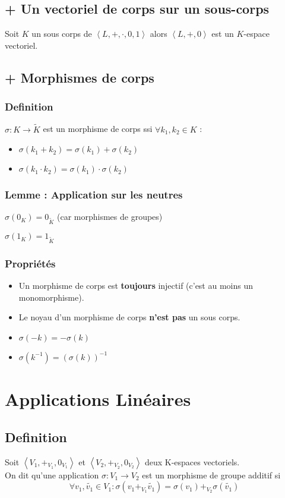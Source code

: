\documentclass[a4paper,10pt]{article}
\newcommand{\ap}{ \rightarrow} %
\newcommand{\mt}[1]{\widetilde{ #1 }} %
\newcommand{\grp}[1]{\left\langle #1 \right\rangle} %
\begin{document}
  \subsection{+ Un vectoriel de corps sur un sous-corps}
   Soit $K$ un sous corps de $\grp{L, + , \cdot, 0, 1}$ alors $\grp{L, +, 0}$ est un $K$-espace vectoriel.

  \subsection{+ Morphismes de corps}
   \subsubsection{Definition}
   $\sigma : K \ap \mt{K}$ est un morphisme de corps ssi $\forall k_1,k_2 \in K$ :
   \begin{itemize}
    \item $\sigma(k_1 + k_2) = \sigma(k_1) + \sigma(k_2)$
    \item $\sigma(k_1 \cdot k_2) = \sigma(k_1) \cdot \sigma(k_2)$
   \end{itemize}

   \subsubsection{Lemme : Application sur les neutres}
    $\sigma(0_K) = 0_{\mt{K}}$ (car morphismes de groupes)

    $\sigma(1_K) = 1_{\mt{K}}$

   \subsubsection{Propriétés}
    \begin{itemize}
     \item Un morphisme de corps est \textbf{toujours} injectif (c'est au moins un monomorphisme).
     \item Le noyau d'un morphisme de corps \textbf{n'est pas} un sous corps.
     \item $\sigma(-k) = - \sigma(k)$
     \item $\sigma(k^{-1}) = (\sigma(k))^{-1}$
    \end{itemize}

 \section{Applications Linéaires}
  \subsection{Definition}
   Soit $\grp{V_1, +_{V_1}, 0_{V_1}}$ et $\grp{V_2, +_{V_2}, 0_{V_2}}$ deux
   K-espaces vectoriels.\\
   On dit qu'une application $\sigma : V_1 \ap V_2$ est un morphisme de groupe
   additif si $$\forall v_1, \mt{v_1} \in V_1 : \sigma(v_1+_{V_1}\mt{v_1}) =
   \sigma(v_1) +_{V_2} \sigma(\mt{v_1})$$
\end{document}
